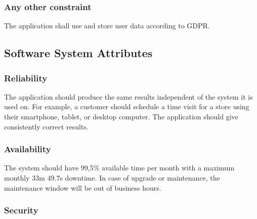 \subsubsection{Any other constraint}


The application shall use and store user data according to GDPR.

\subsection{Software System Attributes}

\subsubsection{Reliability}


The application should produce the same results independent of the system it is used on.
For example, a customer should schedule a time visit for a store using their smartphone, tablet, or desktop computer.
The application should give consistently correct results.


\subsubsection{Availability}


The system should have 99,5\% available time per month with a maximum monthly 33m 49.7s downtime.
In case of upgrade or maintenance, the maintenance window will be out of business hours.

\subsubsection{Security}


